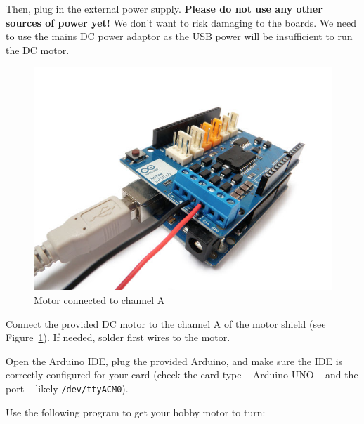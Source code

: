 \documentclass{instructions}
\begin{document}
Then, plug in the external power supply. \textbf{Please do not use any other
sources of power yet!} We don’t want to risk damaging to the boards. We need to use
the mains DC power adaptor as the USB power will be insufficient to run the DC
motor.



\begin{figure}
    \centering
    \includegraphics[width=0.5\linewidth]{motor-connection}
    \caption{Motor connected to channel A}
    \label{connection}
\end{figure}

Connect the provided DC motor to the channel A of the motor shield (see
Figure~\ref{connection}). If needed, solder first wires to the motor.

Open the Arduino IDE, plug the provided Arduino, and make sure the IDE is
correctly configured for your card (check the card type -- Arduino UNO -- and
the port -- likely \texttt{/dev/ttyACM0}).


Use the following program to get your hobby motor to turn:
\end{document}
